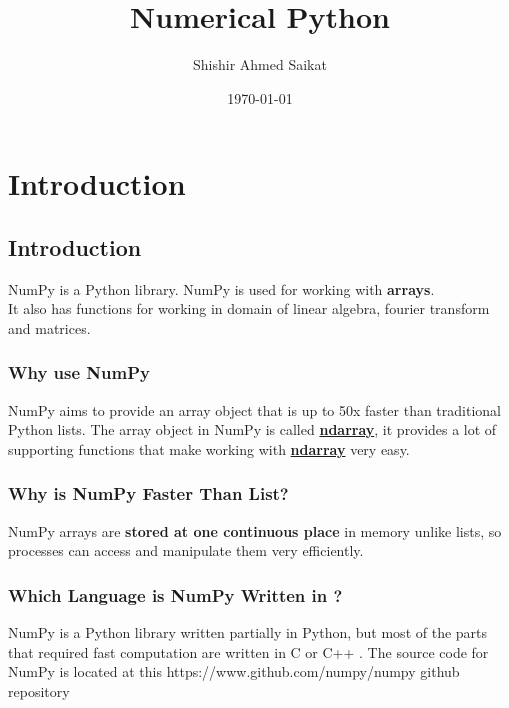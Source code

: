 \documentclass[openany]{book}
\title{Numerical Python}
\author{Shishir Ahmed Saikat}
\date{\today}
\begin{document}
\frontmatter %

\maketitle{}
\tableofcontents

\mainmatter %


\chapter{Introduction}
\section{Introduction}
{NumPy is a Python library.
NumPy is used for working with \textbf{arrays}. \\
It also has functions for working in domain of linear algebra, fourier transform and matrices.\\
}

\subsection{Why use NumPy}
NumPy aims to provide an array object that is up to 50x faster than traditional Python lists. The array object in NumPy is called \textbf{\underline{ndarray}}, it provides a lot of supporting functions that make working with \textbf{\underline{ndarray}} very easy. 

\subsection{Why is NumPy Faster Than List?}

NumPy arrays are \textbf{stored at one continuous place} in memory unlike lists, so processes can access and manipulate them very efficiently.

\subsection{Which Language is NumPy Written in ?}

NumPy is a Python library written partially in Python, but most of the parts that required fast computation are written in C or C++ . The source code for NumPy is located at this {https://www.github.com/numpy/numpy} github repository
\end{document}

